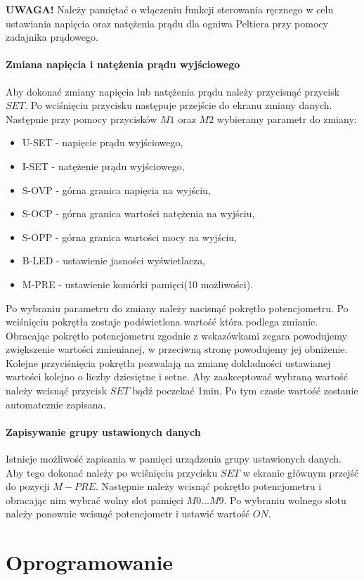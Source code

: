 \documentclass[oneside]{mgr}
\begin{document}
\textbf{UWAGA!} Należy pamiętać o włączeniu funkcji sterowania ręcznego w celu ustawiania napięcia oraz natężenia prądu dla ogniwa Peltiera przy pomocy zadajnika prądowego.
\subsubsection{Zmiana napięcia i natężenia prądu wyjściowego}
Aby dokonać zmiany napięcia lub natężenia prądu należy przycisnąć przycisk $SET$. Po wciśnięciu przycisku następuje przejście do ekranu zmiany danych. Następnie przy pomocy przycisków $M1$ oraz $M2$ wybieramy parametr do zmiany:
\begin{itemize}
    \item U-SET - napięcie prądu wyjściowego,
    \item I-SET - natężenie prądu wyjściowego,
    \item S-OVP - górna granica napięcia na wyjściu,
    \item S-OCP - górna granica wartości natężenia na wyjściu,
    \item S-OPP - górna granica wartości mocy na wyjściu,
    \item B-LED - ustawienie jasności wyświetlacza,
    \item M-PRE - ustawienie komórki pamięci(10 możliwości).
\end{itemize}
Po wybraniu parametru do zmiany należy nacisnąć pokrętło potencjometru. Po wciśnięciu pokrętła zostaje podświetlona wartość która podlega zmianie. Obracając pokrętło potencjometru zgodnie z wskazówkami zegara powodujemy zwiększenie wartości zmienianej, w przeciwną stronę powodujemy jej obniżenie. Kolejne przyciśnięcia pokrętła pozwalają na zmianę dokładności ustawianej wartości kolejno o liczby dziesiętne i setne. Aby zaakceptować wybraną wartość należy wcisnąć przycisk $SET$ bądź poczekać 1min. Po tym czasie wartość zostanie automatcznie zapisana.
\subsubsection{Zapisywanie grupy ustawionych danych}
Istnieje możliwość zapisania w pamięci urządzenia grupy ustawionych danych. Aby tego dokonać należy po wciśnięciu przycisku $SET$ w ekranie głównym przejść do pozycji $M-PRE$. Następnie należy wcisnąć pokrętło potencjometru i obracając nim wybrać wolny slot pamięci $M0\dots M9$. Po wybraniu wolnego slotu należy ponownie wcisnąć potencjometr i ustawić wartość $ON$.

\chapter{Oprogramowanie}
\end{document}

